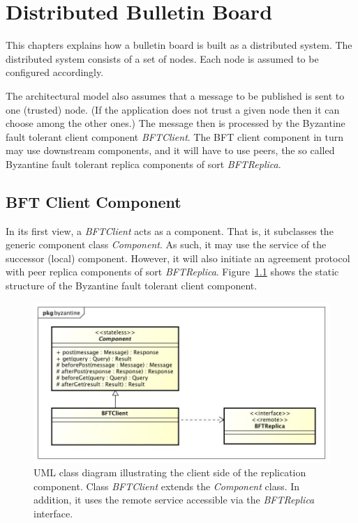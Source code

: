 \documentclass[oneside]{scrreprt}
\newcommand{\fig}[1]{Figure~\ref{#1}}
\begin{document}
\chapter{Distributed Bulletin Board}

This chapters explains how a bulletin board is built as
a distributed system. The distributed system consists of
a set of nodes. Each node is assumed to be configured
accordingly.

The architectural model also assumes that a message to
be published is sent to one (trusted) node. (If the
application does not trust a given node then it can
choose among the other ones.) The message then is
processed by the Byzantine fault tolerant client
component \emph{BFTClient}. The BFT client component in turn
may use downstream components, and it will have
to use peers, the so called Byzantine fault tolerant
replica components of sort \emph{BFTReplica}.


\section{BFT Client Component}

In its first view, a \emph{BFTClient} acts as a component.
That is, it subclasses the generic component class
\emph{Component}. As such, it may use the service of
the successor (local) component. However, it will also
initiate an agreement protocol with peer replica
components of sort \emph{BFTReplica}. \fig{fig:byzantine-client}
shows the static structure of the Byzantine fault tolerant client
component.

\begin{figure}[ht]
\centerline{
\includegraphics[width=1.0\textwidth]{figs/byzantine-client}}
\caption{UML class diagram illustrating the client side
of the replication component. Class \emph{BFTClient} extends the
\emph{Component} class. In addition, it uses the remote service
accessible via the \emph{BFTReplica} interface.}
\label{fig:byzantine-client}
\end{figure}
\end{document}
